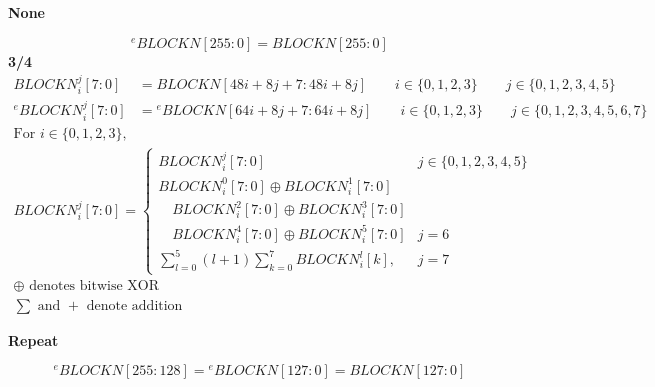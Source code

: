 \hypertarget{None}{\textbf{None}}
\begin{displaymath}
    {}^{e}\!BLOCKN[255\!:\!0] = BLOCKN[255\!:\!0]
\end{displaymath}
\hypertarget{frac_3_4}{\textbf{3/4}}
\begin{align*}
    BLOCKN_{i}^{j}[7:0]
        &= BLOCKN[48i + 8j + 7 : 48i + 8j]
        \qquad i \in \{0,1,2,3\} \qquad j \in \{0,1,2,3,4,5\} \\
    {}^{e}\!BLOCKN_{i}^{j}[7:0]
        &= {}^{e}\!BLOCKN[64i + 8j + 7 : 64i + 8j]
        \qquad i \in \{0,1,2,3\} \qquad j \in \{0,1,2,3,4,5,6,7\}
\end{align*}
\begin{gather*}
    \text{For } i \in \{0,1,2,3\}, \\
    BLOCKN_{i}^{j}[7:0] = 
    \begin{cases}
        BLOCKN_{i}^{j}[7:0] & j \in \{0,1,2,3,4,5\} \\[0.8em]
        BLOCKN_{i}^{0}[7:0] \oplus BLOCKN_{i}^{1}[7:0] \\
        \quad BLOCKN_{i}^{2}[7:0] \oplus BLOCKN_{i}^{3}[7:0] \\
        \quad BLOCKN_{i}^{4}[7:0] \oplus BLOCKN_{i}^{5}[7:0] & j = 6 \\[0.8em]
        \sum\limits_{l=0}^{5} (l+1) \sum\limits_{k=0}^{7} BLOCKN_{i}^{l}[k], & j = 7
      \end{cases} \\
    \oplus \text{ denotes bitwise XOR} \\
    \sum \text{ and } + \text{ denote addition}
  \end{gather*}
  

\hypertarget{Repeat}{\textbf{Repeat}}
\begin{displaymath}
    {}^{e}\!BLOCKN[255\!:\!128] = {}^{e}\!BLOCKN[127\!:\!0] = BLOCKN[127\!:\!0]
\end{displaymath}
